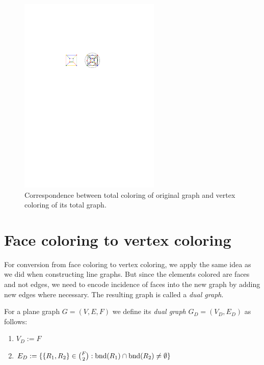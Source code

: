\begin{figure}[H]
    \centering
    \includegraphics[width=0.6\textwidth]{../Resources/Figs/cubical_tot_g_clring_opt.pdf}
    \caption{Correspondence between total coloring of original graph and vertex coloring of its total graph.}
    \label{fig:cubical_tot_g_clring}
\end{figure}

\section{Face coloring to vertex coloring}

For conversion from face coloring to vertex coloring, we apply the same idea as we did when constructing line graphs. But since the elements colored are faces and not edges, we need to encode incidence of faces into the new graph by adding new edges where necessary. The resulting graph is called a \textit{dual graph}.

\begin{defn}
    For a plane graph $G=(V,E,F)$ we define its \emph{dual graph} $G_D=(V_D,E_D)$ as follows:
    \begin{enumerate}
        \item $V_D := F$
        \item $E_D := \{ \{R_1,R_2\} \in \binom{F}{2}: \operatorname{bnd}(R_1) \cap \operatorname{bnd}(R_2) \neq \emptyset \}$
    \end{enumerate}
\end{defn}

